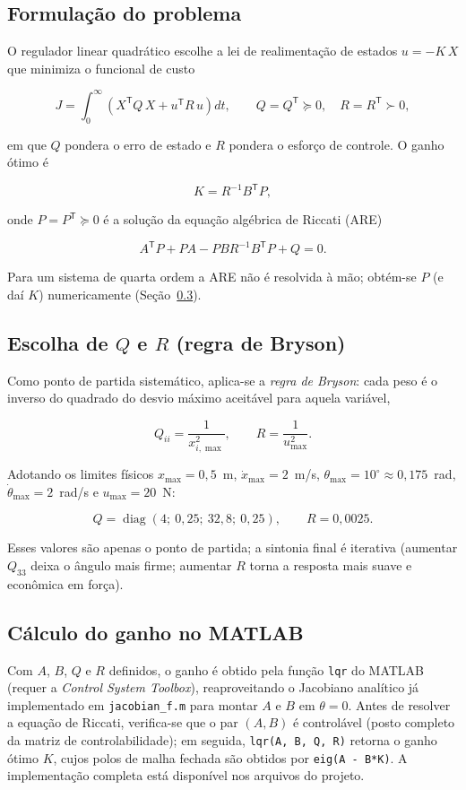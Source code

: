 \documentclass[brazil, 12pt]{article}
\begin{document}
\subsection{Formulação do problema}

O regulador linear quadrático escolhe a lei de realimentação de estados
$u = -K\,X$ que minimiza o funcional de custo

\[
J = \int_{0}^{\infty}
\left( X^{\mathsf T} Q\, X + u^{\mathsf T} R\, u \right) dt,
\qquad Q = Q^{\mathsf T} \succeq 0, \quad R = R^{\mathsf T} \succ 0,
\]

em que $Q$ pondera o erro de estado e $R$ pondera o esforço de controle. O ganho
ótimo é

\[
K = R^{-1} B^{\mathsf T} P,
\]

onde $P = P^{\mathsf T} \succeq 0$ é a solução da equação algébrica de Riccati (ARE)

\[
A^{\mathsf T} P + P A - P B R^{-1} B^{\mathsf T} P + Q = 0.
\]

Para um sistema de quarta ordem a ARE não é resolvida à mão; obtém-se $P$ (e daí
$K$) numericamente (Seção~\ref{sec:matlab}).

\subsection{Escolha de $Q$ e $R$ (regra de Bryson)}

Como ponto de partida sistemático, aplica-se a \emph{regra de Bryson}: cada peso
é o inverso do quadrado do desvio máximo aceitável para aquela variável,

\[
Q_{ii} = \frac{1}{x_{i,\max}^{2}}, \qquad R = \frac{1}{u_{\max}^{2}}.
\]

Adotando os limites físicos $x_{\max}=0{,}5$~m, $\dot{x}_{\max}=2$~m/s,
$\theta_{\max}=10^{\circ}\approx0{,}175$~rad, $\dot{\theta}_{\max}=2$~rad/s e
$u_{\max}=20$~N:

\[
Q = \operatorname{diag}(4;\ 0{,}25;\ 32{,}8;\ 0{,}25),
\qquad R = 0{,}0025.
\]

Esses valores são apenas o ponto de partida; a sintonia final é iterativa
(aumentar $Q_{33}$ deixa o ângulo mais firme; aumentar $R$ torna a resposta mais
suave e econômica em força).

\subsection{Cálculo do ganho no MATLAB}
\label{sec:matlab}

Com $A$, $B$, $Q$ e $R$ definidos, o ganho é obtido pela função \texttt{lqr}
do MATLAB (requer a \emph{Control System Toolbox}), reaproveitando o Jacobiano
analítico já implementado em \texttt{jacobian\_f.m} para montar $A$ e $B$ em
$\theta = 0$. Antes de resolver a equação de Riccati, verifica-se que o par
$(A,B)$ é controlável (posto completo da matriz de controlabilidade); em
seguida, \texttt{lqr(A, B, Q, R)} retorna o ganho ótimo $K$, cujos polos de
malha fechada são obtidos por \texttt{eig(A - B*K)}. A implementação completa
está disponível nos arquivos do projeto.
\end{document}
